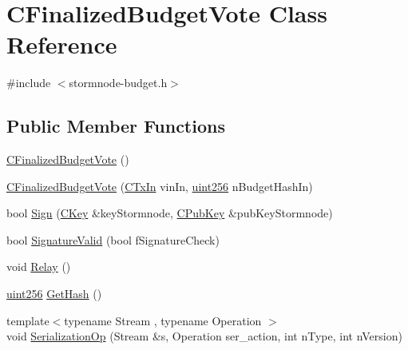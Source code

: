 \hypertarget{class_c_finalized_budget_vote}{}\section{C\+Finalized\+Budget\+Vote Class Reference}
\label{class_c_finalized_budget_vote}


{\ttfamily \#include $<$stormnode-\/budget.\+h$>$}

\subsection*{Public Member Functions}
\begin{DoxyCompactItemize}
\item 
\hyperlink{class_c_finalized_budget_vote_a438df4e8eb7a4fedeac74550a4fa3cc2}{C\+Finalized\+Budget\+Vote} ()
\item 
\hyperlink{class_c_finalized_budget_vote_adc08bd33a9dde17ab5617d99d1f94f89}{C\+Finalized\+Budget\+Vote} (\hyperlink{class_c_tx_in}{C\+Tx\+In} vin\+In, \hyperlink{classuint256}{uint256} n\+Budget\+Hash\+In)
\item 
bool \hyperlink{class_c_finalized_budget_vote_ac417b917ae18df17838b49371435c64a}{Sign} (\hyperlink{class_c_key}{C\+Key} \&key\+Stormnode, \hyperlink{class_c_pub_key}{C\+Pub\+Key} \&pub\+Key\+Stormnode)
\item 
bool \hyperlink{class_c_finalized_budget_vote_aadcc860c6efe5122388a372641297014}{Signature\+Valid} (bool f\+Signature\+Check)
\item 
void \hyperlink{class_c_finalized_budget_vote_a7c95f6ac01efc3975369bc7bdb8b83d0}{Relay} ()
\item 
\hyperlink{classuint256}{uint256} \hyperlink{class_c_finalized_budget_vote_a517d29944e7c56809034f47ff2b91633}{Get\+Hash} ()
\item 
{\footnotesize template$<$typename Stream , typename Operation $>$ }\\void \hyperlink{class_c_finalized_budget_vote_a751d723816089e73debb2cdafea5699a}{Serialization\+Op} (Stream \&s, Operation ser\+\_\+action, int n\+Type, int n\+Version)
\end{DoxyCompactItemize}
